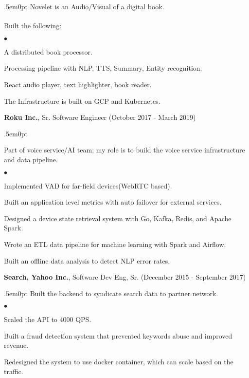 \documentclass[margin, line, 10pt]{res}
\newenvironment{list2}{
  \begin{list}{$\bullet$}{%
      \setlength{\itemsep}{0in}
      \setlength{\parsep}{0in} \setlength{\parskip}{0in}
      \setlength{\topsep}{0in} \setlength{\partopsep}{0in}
      \setlength{\leftmargin}{0.2in}}}{\end{list}}
\begin{document}
\begin{resume}
\begin{adjustwidth}{.5em}{0pt}
  \vspace{-.3cm}
  Novelet is an Audio/Visual of a digital book.\\ \\
  \vspace{.2cm}
  Built the following:
  \begin{list2}
  \item A distributed book processor.
  \item Processing pipeline with NLP, TTS, Summary, Entity recognition.
  \item React audio player, text highlighter, book reader.
  \item The Infrastructure is built on GCP and Kubernetes.
  \end{list2}
  \vspace{.05cm}
\end{adjustwidth}


{\Large {\bf Roku Inc.}},  Sr. Software Engineer \hfill (October 2017 - March 2019)\\
\begin{adjustwidth}{.5em}{0pt}

  \vspace{-.3cm}
  Part of voice service/AI team; my role is to build the voice service infrastructure and data pipeline.

  \begin{list2}
    \vspace{.2cm}
  \item Implemented VAD for far-field devices(WebRTC based).
  \item Built an application level metrics with auto failover for external services.
  \item Designed a device state retrieval system with Go, Kafka, Redis, and Apache Spark.
  \item Wrote an ETL data pipeline for machine learning with Spark and Airflow.
  \item Built an offline data analysis to detect NLP error rates.
  \end{list2}
  \vspace{.05cm}
\end{adjustwidth}

{\Large {\bf Search, Yahoo Inc.}}, Software Dev Eng, Sr. \hfill (December 2015 - September 2017)\\
\begin{adjustwidth}{.5em}{0pt}
  \vspace{-.3cm}
  Built the backend to syndicate search data to partner network.
  \begin{list2}
  \vspace{.2cm}
  \item Scaled the API to 4000 QPS.
  \item Built a fraud detection system that prevented keywords abuse and improved revenue.
  \item Redesigned the system to use docker container, which can scale based on the traffic.
  \end{list2}
  \vspace{.05cm}
\end{adjustwidth}


\end{resume}
\end{document}

